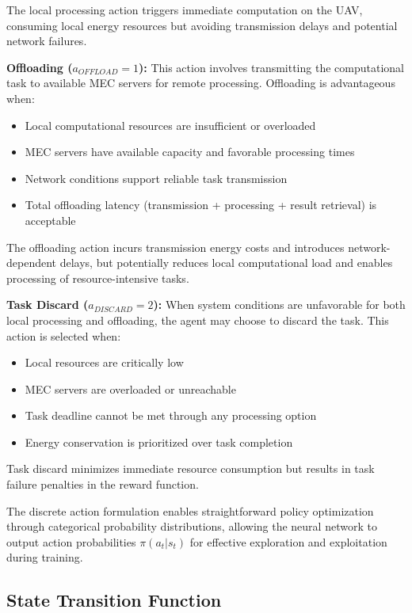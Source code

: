 \documentclass[journal]{IEEEtran}
\begin{document}
The local processing action triggers immediate computation on the UAV, consuming local energy resources but avoiding transmission delays and potential network failures.

\textbf{Offloading ($a_{OFFLOAD} = 1$):} This action involves transmitting the computational task to available MEC servers for remote processing. Offloading is advantageous when:
\begin{itemize}
\item Local computational resources are insufficient or overloaded
\item MEC servers have available capacity and favorable processing times
\item Network conditions support reliable task transmission
\item Total offloading latency (transmission + processing + result retrieval) is acceptable
\end{itemize}

The offloading action incurs transmission energy costs and introduces network-dependent delays, but potentially reduces local computational load and enables processing of resource-intensive tasks.

\textbf{Task Discard ($a_{DISCARD} = 2$):} When system conditions are unfavorable for both local processing and offloading, the agent may choose to discard the task. This action is selected when:
\begin{itemize}
\item Local resources are critically low 
\item MEC servers are overloaded or unreachable
\item Task deadline cannot be met through any processing option
\item Energy conservation is prioritized over task completion
\end{itemize}

Task discard minimizes immediate resource consumption but results in task failure penalties in the reward function.

The discrete action formulation enables straightforward policy optimization through categorical probability distributions, allowing the neural network to output action probabilities $\pi(a_t|s_t)$ for effective exploration and exploitation during training.

\subsection{State Transition Function}
\end{document}
